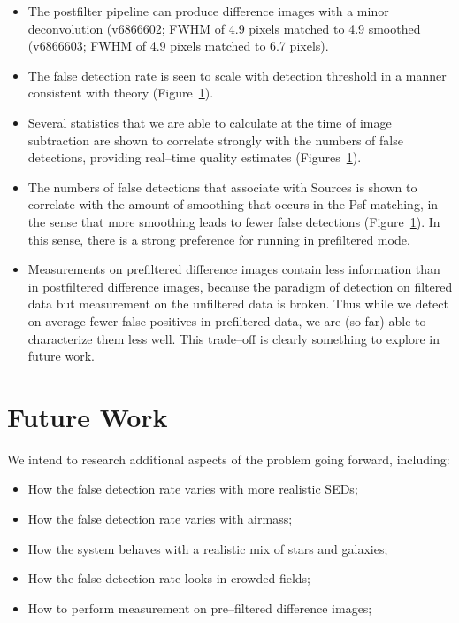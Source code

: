 \documentclass[prd, nofootinbib, floatfix, 11pt,tightenlines,times]{article}
\begin{document}
\begin{itemize}
\item The postfilter pipeline can produce difference images with a
  minor deconvolution (v6866602; FWHM of 4.9 pixels matched to 4.9
  smoothed (v6866603; FWHM of 4.9 pixels matched to 6.7 pixels).

\item The false detection rate is seen to scale with detection
  threshold in a manner consistent with theory (Figure~\ref{}).

\item Several statistics that we are able to calculate at the time of
  image subtraction are shown to correlate strongly with the numbers
  of false detections, providing real--time quality estimates
  (Figures~\ref{}).

\item The numbers of false detections that associate with Sources is
  shown to correlate with the amount of smoothing that occurs in the
  Psf matching, in the sense that more smoothing leads to fewer false
  detections (Figure~\ref{}).  In this sense, there is a strong
  preference for running in prefiltered mode.

\item Measurements on prefiltered difference images contain less
  information than in postfiltered difference images, because the
  paradigm of detection on filtered data but measurement on the
  unfiltered data is broken.  Thus while we detect on average fewer
  false positives in prefiltered data, we are (so far) able to
  characterize them less well.  This trade--off is clearly something
  to explore in future work.

\end{itemize}

\section{Future Work}

We intend to research additional aspects of the problem going forward,
including:
\begin{itemize}
\item How the false detection rate varies with more realistic SEDs;
\item How the false detection rate varies with airmass;
\item How the system behaves with a realistic mix of stars and galaxies;
\item How the false detection rate looks in crowded fields;
\item How to perform measurement on pre--filtered difference images;
\end{itemize}
\end{document}
